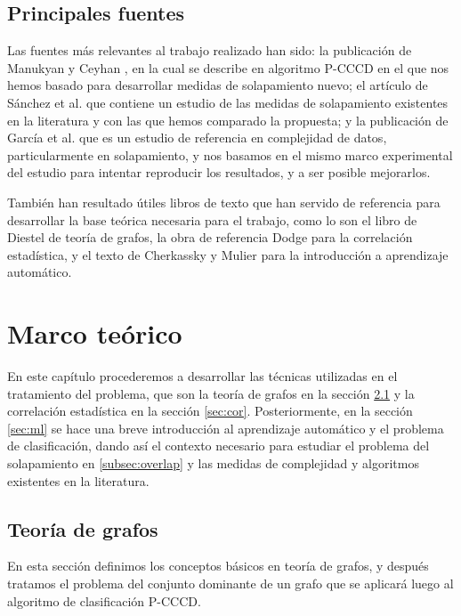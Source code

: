 \documentclass[a4paper,12pt]{report}
\theoremstyle{definition}
\begin{document}
\section{Principales fuentes}
Las fuentes más relevantes al trabajo realizado han sido: la publicación de Manukyan y Ceyhan \cite{manukyan2016classification}, en la cual se describe en algoritmo P-CCCD en el que nos hemos basado para desarrollar medidas de solapamiento nuevo; el artículo de Sánchez et al. \cite{sanchez2007analysis} que contiene un estudio de las medidas de solapamiento existentes en la literatura y con las que hemos comparado la propuesta; y la publicación de García et al. \cite{garcia2009diagnose} que es un estudio de referencia en complejidad de datos, particularmente en solapamiento, y nos basamos en el mismo marco experimental del estudio para intentar reproducir los resultados, y a ser posible mejorarlos.

También han resultado útiles libros de texto que han servido de referencia para desarrollar la base teórica necesaria para el trabajo, como lo son el libro de Diestel \cite{diestel2012graph} de teoría de grafos, la obra de referencia Dodge \cite{dodge2008concise} para la correlación estadística, y el texto de Cherkassky y Mulier \cite{cherkassky2007learning} para la introducción a aprendizaje automático.

\chapter{Marco teórico}
\label{chp:prelim}
En este capítulo procederemos a desarrollar las técnicas utilizadas en el tratamiento del problema, que son la teoría de grafos en la sección \ref{sec:grafo} y la correlación estadística en la sección \ref{sec:cor}. Posteriormente, en la sección \ref{sec:ml} se hace una breve introducción al aprendizaje automático y el problema de clasificación, dando así el contexto necesario para estudiar el problema del solapamiento en \ref{subsec:overlap} y las medidas de complejidad y algoritmos existentes en la literatura.

\section{Teoría de grafos}
\label{sec:grafo}

En esta sección definimos los conceptos básicos en teoría de grafos, y después tratamos el problema del conjunto dominante de un grafo que se aplicará luego al algoritmo de clasificación P-CCCD.
\end{document}
